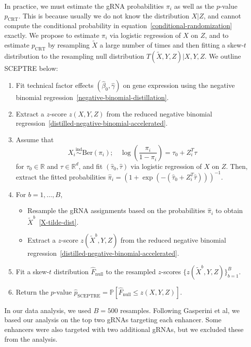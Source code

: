 \documentclass{nature}
\begin{document}
In practice, we must estimate the gRNA probabilities $\pi_i$ as well as the $p$-value $p_{\text{CRT}}$. This is because usually we do not know the distribution $X|Z$, and cannot compute the conditional probability in equation~\eqref{conditional-randomization} exactly. We propose to estimate $\pi_i$ via logistic regression of $X$ on $Z$, and to estimate $p_{\text{CRT}}$ by resampling $\widetilde X$ a large number of times and then fitting a skew-$t$ distribution to the resampling null distribution $T(\widetilde X, Y, Z)|X,Y,Z$. We outline SCEPTRE below: 
\begin{enumerate}
	\item Fit technical factor effects $(\widehat \beta_0,\widehat \gamma)$ on gene expression using the negative binomial regression~\eqref{negative-binomial-distillation}.
	\item Extract a $z$-score $z(X,Y,Z)$ from the reduced negative binomial regression~\eqref{distilled-negative-binomial-accelerated}.
	\item Assume that 
	\begin{equation}
	X_i \overset{\text{ind}}\sim \text{Ber}(\pi_i); \quad \log\left(\frac{\pi_i}{1-\pi_i}\right) = \tau_0 + Z_i^T \tau
	\label{logistic-regression}
	\end{equation}
	for $\tau_0 \in \mathbb R$ and $\tau \in \mathbb R^d$, and fit $(\widehat \tau_0, \widehat \tau)$ via logistic regression of $X$ on $Z$. Then, extract the fitted probabilities $\widehat \pi_i = (1+\exp(-(\widehat \tau_0 + Z_i^T \widehat \tau)))^{-1}$.	
	\item For $b = 1, \dots, B$,
	\begin{itemize}
		\item Resample the gRNA assignments based on the probabilities $\widehat \pi_i$ to obtain $\widetilde X^b$~\eqref{X-tilde-dist}.
		\item Extract a $z$-score $z(\widetilde X^b, Y, Z)$ from the reduced negative binomial regression~\eqref{distilled-negative-binomial-accelerated}.
	\end{itemize}
	\item Fit a skew-$t$ distribution $\widehat F_{\text{null}}$ to the resampled $z$-scores $\{z(\widetilde X^b, Y, Z)\}_{b = 1}^B$. 
	\item Return the $p$-value $\widehat p_{\text{SCEPTRE}} = \mathbb P[\widehat F_{\text{null}} \leq z(X,Y,Z)]$.
\end{enumerate}
In our data analysis, we used $B = 500$ resamples. Following Gasperini et al, we based our analysis on the top two gRNAs targeting each enhancer. Some enhancers were also targeted with two additional gRNAs, but we excluded these from the analysis.
\end{document}

